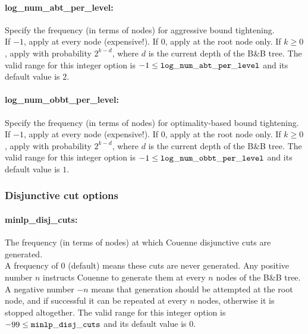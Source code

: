 
\paragraph{log\_num\_abt\_per\_level:}\label{sec:log_num_abt_per_level} Specify the frequency (in terms of nodes) for aggressive bound tightening. $\;$ \\
If $-1$, apply at every node (expensive!).
If 0, apply at the root node only.
If $k\geq 0$, apply with probability $2^{k-d}$, where $d$ is the current depth of the B\&B tree.
The valid range for this integer option is $-1 \le {\tt log\_num\_abt\_per\_level }$ and its default value is $2$.

\paragraph{log\_num\_obbt\_per\_level:}\label{sec:log_num_obbt_per_level} Specify the frequency (in terms of nodes) for optimality-based bound tightening. $\;$ \\
If $-1$, apply at every node (expensive!).
If 0, apply at the root node only.
If $k\geq 0$, apply with probability $2^{k-d}$, where $d$ is the current depth of the B\&B tree.
The valid range for this integer option is $-1 \le {\tt log\_num\_obbt\_per\_level }$ and its default value is $1$.

\subsubsection{Disjunctive cut options}

\paragraph{minlp\_disj\_cuts:}\label{sec:minlp_disj_cuts} The frequency (in terms of nodes) at which Couenne disjunctive cuts are generated. $\;$ \\
A frequency of 0 (default) means these cuts are never generated.
Any positive number $n$ instructs Couenne to generate them at every $n$ nodes of the B\&B tree.
A negative number $-n$ means that generation should be attempted at the root node, and if successful it can be repeated at every $n$ nodes, otherwise it is stopped altogether.
The valid range for this integer option is $-99 \le {\tt minlp\_disj\_cuts }$ and its default value is $0$.

